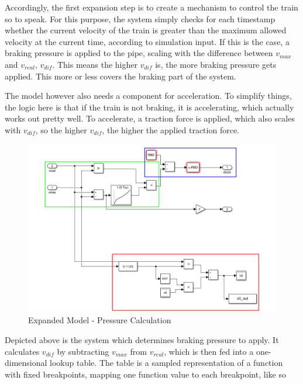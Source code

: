 \par
Accordingly, the first expansion step is to create a mechanism to control the train so to speak. For this purpose, the system simply checks for each timestamp whether the current velocity of the train is greater than the maximum allowed velocity at the current time, according to simulation input. If this is the case, a braking pressure is applied to the pipe, scaling with the difference between $v_{max}$ and $v_{real}$, $v_{dif}$. This means the higher $v_{dif}$ is, the more braking pressure gets applied. This more or less covers the braking part of the system.

\par
The model however also needs a component for acceleration. To simplify things, the logic here is that if the train is not braking, it is accelerating, which actually works out pretty well. To accelerate, a traction force is applied, which also scales with $v_{dif}$, so the higher $v_{dif}$, the higher the applied traction force.

\begin{figure}[H]
	\centering
	\includegraphics[width=\linewidth]{./pic/expandedmodel_pressure}
	\caption{Expanded Model - Pressure Calculation}
	\label{fig:expandedmodel_pressure}
\end{figure}

\par\noindent
Depicted above is the system which determines braking pressure to apply. It calculates $v_{dif}$ by subtracting $v_{max}$ from $v_{real}$, which is then fed into a one-dimensional lookup table. The table is a sampled representation of a function with fixed breakpoints, mapping one function value to each breakpoint, like so

